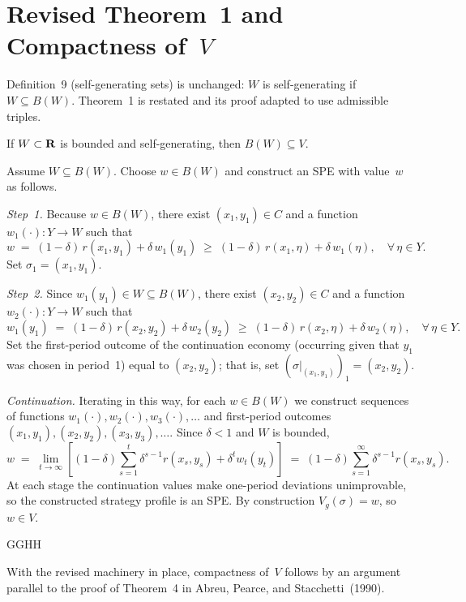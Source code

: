 \section{Revised Theorem~1 and Compactness of~$V$}

Definition~9 (self-generating sets) is unchanged: $W$ is
self-generating if $W\subseteq B(W)$.  Theorem~1 is restated and its
proof adapted to use admissible triples.

If $W\subset{\bf R}$ is bounded and self-generating, then
$B(W)\subseteq V$.
\endTheorem

\Proof
Assume $W\subseteq B(W)$.  Choose $w\in B(W)$ and construct an SPE
with value~$w$ as follows.

\medskip\noindent
{\it Step~1.\/}
Because $w\in B(W)$, there exist $(x_1,y_1)\in C$ and a function
$w_1(\cdot):Y\to W$ such that
$$  w \;=\; (1-\delta)\,r(x_1,y_1)+\delta\,w_1(y_1)
    \;\geq\;
    (1-\delta)\,r(x_1,\eta)+\delta\,w_1(\eta) ,
    \quad \forall\,\eta\in Y .  $$
Set $\sigma_1=(x_1,y_1)$.

\medskip\noindent
{\it Step~2.\/}
Since $w_1(y_1)\in W\subseteq B(W)$, there exist $(x_2,y_2)\in C$ and
a function $w_2(\cdot):Y\to W$ such that
$$  w_1(y_1) \;=\; (1-\delta)\,r(x_2,y_2)+\delta\,w_2(y_2)
    \;\geq\;
    (1-\delta)\,r(x_2,\eta)+\delta\,w_2(\eta) ,
    \quad \forall\,\eta\in Y .  $$
Set the first-period outcome of the continuation economy (occurring
given that $y_1$ was chosen in period~1) equal to $(x_2,y_2)$; that
is, set $(\sigma|_{(x_1,y_1)})_1=(x_2,y_2)$.

\medskip\noindent
{\it Continuation.\/}
Iterating in this way, for each $w\in B(W)$ we construct sequences of
functions $w_1(\cdot),w_2(\cdot),w_3(\cdot),\ldots$ and
first-period outcomes $(x_1,y_1),(x_2,y_2),(x_3,y_3),\ldots$.
Since $\delta<1$ and $W$ is bounded,
$$  w
    \;=\; \lim_{t\to\infty}
           \left[
             (1-\delta)\sum_{s=1}^{t}\delta^{s-1}r(x_s,y_s)
             +\delta^t w_t(y_t)
           \right]
    \;=\; (1-\delta)\sum_{s=1}^{\infty}\delta^{s-1}r(x_s,y_s) .  $$
At each stage the continuation values make one-period deviations
unimprovable, so the constructed strategy profile is an SPE.  By
construction $V_g(\sigma)=w$, so $w\in V$.
\endProof

GGHH

\medskip
With the revised machinery in place, compactness of~$V$ follows by an
argument parallel to the proof of Theorem~4 in Abreu, Pearce, and
Stacchetti~(1990).

